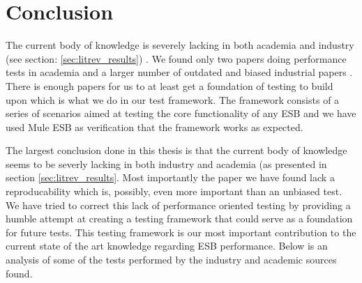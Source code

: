 \section{Conclusion}

The current body of knowledge is severely lacking in both academia and industry (see section: \ref{sec:litrev_results}) . 
We found only two papers \cite{Sanjay2011,Garcia2010} doing performance tests in academia and a larger number of outdated and biased industrial papers \cite{Perera07,Perera07R2,Perera07R3,mulesoft08}.
There is enough papers for us to at least get a foundation of testing to build upon which is what we do in our test framework. 
The framework consists of a series of scenarios aimed at testing the core functionality of any ESB and we have used Mule ESB as verification that the framework works as expected. 

The largest conclusion done in this thesis is that the current body of knowledge seems to be severly lacking in both industry and academia (as presented in section \ref{sec:litrev_results}. 
Most importantly the paper we have found \cite{Sanjay2011} lack a reproducability which is, possibly, even more important than an unbiased test. 
We have tried to correct this lack of performance oriented testing by providing a humble attempt at creating a testing framework that could serve as a foundation for future tests. 
This testing framework is our most important contribution to the current state of the art knowledge regarding ESB performance.
Below is an analysis of some of the tests performed by the industry and academic sources found.

